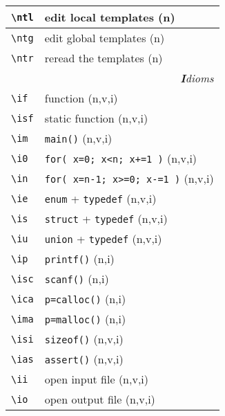 \documentclass[oneside,10pt,landscape,DIV16]{scrartcl}
\begin{document}
\begin{multicols}{3}
\begin{center}
\begin{tabular}[]{|p{11mm}|p{58mm}|}
%
\hline \verb'\ntl' & edit local templates      \hfill (n)\\
\hline \verb'\ntg' & edit global templates     \hfill (n)\\
\hline \verb'\ntr' & reread the templates      \hfill (n)\\
\hline
\hline 
\multicolumn{2}{|r|}{\textsl{\textbf{I}dioms}}   \\
\hline \verb'\if'  & function                         \hfill (n,v,i)\\
\hline \verb'\isf' & static function                  \hfill (n,v,i)\\
\hline \verb'\im'  & \verb'main()'                    \hfill (n,v,i)\\
\hline \verb'\i0'  & \verb'for( x=0; x<n; x+=1 )'     \hfill (n,v,i)\\
\hline \verb'\in'  & \verb'for( x=n-1; x>=0; x-=1 )'  \hfill (n,v,i)\\
\hline \verb'\ie'  & \verb'enum'   + \verb'typedef'   \hfill (n,v,i)\\
\hline \verb'\is'  & \verb'struct' + \verb'typedef'   \hfill (n,v,i)\\
\hline \verb'\iu'  & \verb'union'  + \verb'typedef'   \hfill (n,v,i)\\
\hline \verb'\ip'  & \verb'printf()'                  \hfill (n,i)\\
\hline \verb'\isc' & \verb'scanf()'                   \hfill (n,i)\\
\hline \verb'\ica' & \verb'p=calloc()'                \hfill (n,i)\\
\hline \verb'\ima' & \verb'p=malloc()'                \hfill (n,i)\\
\hline \verb'\isi' & \verb'sizeof()'                  \hfill (n,v,i)\\
\hline \verb'\ias' & \verb'assert()'                  \hfill (n,v,i)\\
\hline \verb'\ii'  & open input file                  \hfill (n,v,i)\\
\hline \verb'\io'  & open output file                 \hfill (n,v,i)\\
\hline
\end{tabular} \\


\end{center}
\end{multicols}
\end{document}
